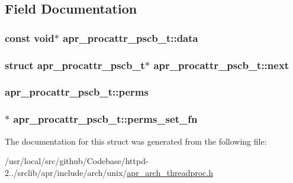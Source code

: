 \subsection{Field Documentation}
\subsubsection[{\texorpdfstring{data}{data}}]{\setlength{\rightskip}{0pt plus 5cm}const {\bf void}$\ast$ apr\+\_\+procattr\+\_\+pscb\+\_\+t\+::data}\hypertarget{structapr__procattr__pscb__t_aec8e4133ebc56c855cd8cc2179e44813}{}\label{structapr__procattr__pscb__t_aec8e4133ebc56c855cd8cc2179e44813}
\subsubsection[{\texorpdfstring{next}{next}}]{\setlength{\rightskip}{0pt plus 5cm}struct {\bf apr\+\_\+procattr\+\_\+pscb\+\_\+t}$\ast$ apr\+\_\+procattr\+\_\+pscb\+\_\+t\+::next}\hypertarget{structapr__procattr__pscb__t_a71bc74568c4ac1851f8a24dd40c946de}{}\label{structapr__procattr__pscb__t_a71bc74568c4ac1851f8a24dd40c946de}
\subsubsection[{\texorpdfstring{perms}{perms}}]{ apr\+\_\+procattr\+\_\+pscb\+\_\+t\+::perms}\hypertarget{structapr__procattr__pscb__t_aa363acd2012e50d7a3f22ddaaec7ab21}{}\label{structapr__procattr__pscb__t_aa363acd2012e50d7a3f22ddaaec7ab21}
\subsubsection[{\texorpdfstring{perms\+\_\+set\+\_\+fn}{perms_set_fn}}]{$\ast$ apr\+\_\+procattr\+\_\+pscb\+\_\+t\+::perms\+\_\+set\+\_\+fn}\hypertarget{structapr__procattr__pscb__t_aab7ac16eaa53ac21853d55015d713068}{}\label{structapr__procattr__pscb__t_aab7ac16eaa53ac21853d55015d713068}


The documentation for this struct was generated from the following file\+:\begin{DoxyCompactItemize}
\item 
/usr/local/src/github/\+Codebase/httpd-\/2../srclib/apr/include/arch/unix/\hyperlink{unix_2apr__arch__threadproc_8h}{apr\+\_\+arch\+\_\+threadproc.\+h}\end{DoxyCompactItemize}
